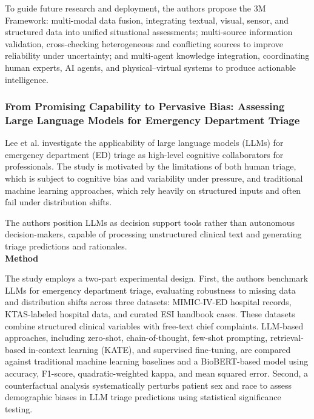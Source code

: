 To guide future research and deployment, the authors propose the 3M Framework: multi-modal data fusion, integrating textual, visual, sensor, and structured data into unified situational assessments; multi-source information validation, cross-checking heterogeneous and conflicting sources to improve reliability under uncertainty; and multi-agent knowledge integration, coordinating human experts, AI agents, and physical–virtual systems to produce actionable intelligence.
\\


\subsubsection{From Promising Capability to Pervasive Bias: Assessing Large Language Models
for Emergency Department Triage \cite{lee2025llm_triage_bias}}

Lee et al.
investigate the applicability of large language models (LLMs) for emergency department (ED) triage as high-level cognitive collaborators for professionals.
The study is motivated by the limitations of both human triage, which is subject to cognitive bias and variability under pressure, and traditional machine learning approaches, which rely heavily on structured inputs and often fail under distribution shifts.

The authors position LLMs as decision support tools rather than autonomous decision-makers, capable of processing unstructured clinical text and generating triage predictions and rationales.
\\


\textbf{Method}

The study employs a two-part experimental design.
First, the authors benchmark LLMs for emergency department triage, evaluating robustness to missing data and distribution shifts across three datasets: MIMIC-IV-ED hospital records, KTAS-labeled hospital data, and curated ESI handbook cases.
These datasets combine structured clinical variables with free-text chief complaints.
LLM-based approaches, including zero-shot, chain-of-thought, few-shot prompting, retrieval-based in-context learning (KATE), and supervised fine-tuning, are compared against traditional machine learning baselines and a BioBERT-based model using accuracy, F1-score, quadratic-weighted kappa, and mean squared error.
Second, a counterfactual analysis systematically perturbs patient sex and race to assess demographic biases in LLM triage predictions using statistical significance testing.
\\

